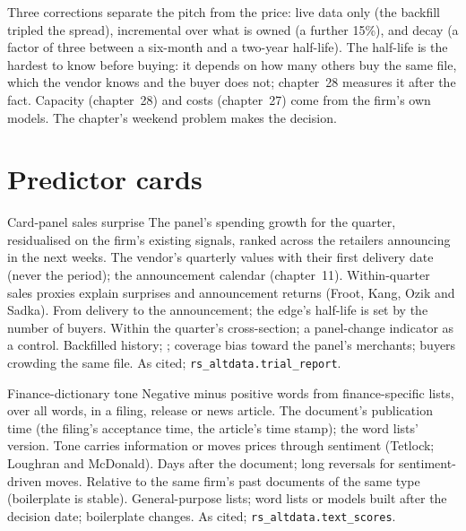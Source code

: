 Three corrections separate the pitch from the price: live data only (the backfill tripled the spread), incremental over what is owned (a
further 15\%), and decay (a factor of three between a six-month and a two-year half-life). The half-life is the hardest to know before
buying: it depends on how many others buy the same file, which the vendor knows and the buyer does not; chapter~28 measures it after the fact.
Capacity (chapter~28) and costs (chapter~27) come from the firm's own models. The chapter's weekend problem makes the decision.

\section{Predictor cards}

\begin{predictorcard}{Card-panel sales surprise}\label{pred:rs:alternative-and-text-data:card}
 The panel's spending growth for the quarter, residualised on the firm's existing signals, ranked across the retailers
announcing in the next weeks.
 The vendor's quarterly values with their first delivery date (never the period); the announcement calendar
(chapter~11).
 Within-quarter sales proxies explain surprises and announcement returns (Froot, Kang, Ozik and Sadka).
 From delivery to the announcement; the edge's half-life is set by the number of buyers.
 Within the quarter's cross-section; a panel-change indicator as a control.
 Backfilled history; ; coverage bias toward the panel's merchants; buyers crowding the same file.
 As cited; \texttt{rs\_altdata.trial\_report}.
\end{predictorcard}

\begin{predictorcard}{Finance-dictionary tone}\label{pred:rs:alternative-and-text-data:tone}
 Negative minus positive words from finance-specific lists, over all words, in a filing, release or news article.
 The document's publication time (the filing's acceptance time, the article's time stamp); the word lists'
version.
 Tone carries information or moves prices through sentiment (Tetlock; Loughran and McDonald).
 Days after the document; long reversals for sentiment-driven moves.
 Relative to the same firm's past documents of the same type (boilerplate is stable).
 General-purpose lists; word lists or models built after the decision date; boilerplate changes.
 As cited; \texttt{rs\_altdata.text\_scores}.
\end{predictorcard}

